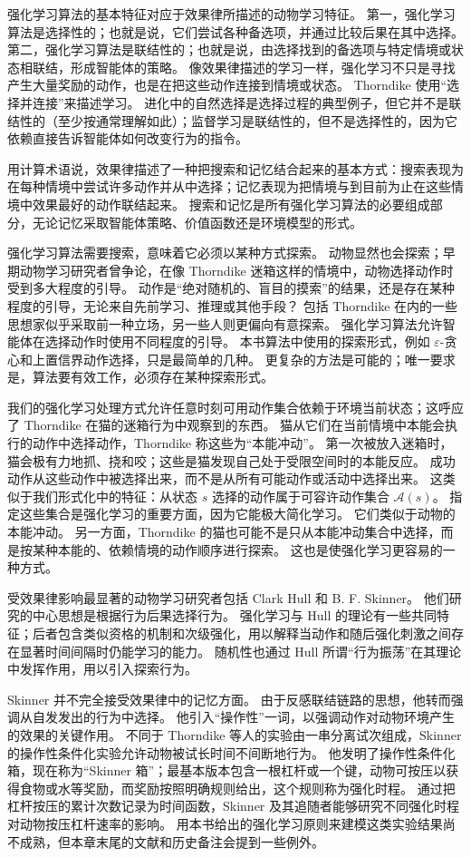 \documentclass[UTF8,12pt,a4paper,fontset=fandol]{ctexart}
\begin{document}
强化学习算法的基本特征对应于效果律所描述的动物学习特征。
第一，强化学习算法是选择性的；也就是说，它们尝试各种备选项，并通过比较后果在其中选择。
第二，强化学习算法是联结性的；也就是说，由选择找到的备选项与特定情境或状态相联结，形成智能体的策略。
像效果律描述的学习一样，强化学习不只是寻找产生大量奖励的动作，也是在把这些动作连接到情境或状态。
Thorndike 使用“选择并连接”来描述学习。
进化中的自然选择是选择过程的典型例子，但它并不是联结性的（至少按通常理解如此）；监督学习是联结性的，但不是选择性的，因为它依赖直接告诉智能体如何改变行为的指令。

用计算术语说，效果律描述了一种把搜索和记忆结合起来的基本方式：搜索表现为在每种情境中尝试许多动作并从中选择；记忆表现为把情境与到目前为止在这些情境中效果最好的动作联结起来。
搜索和记忆是所有强化学习算法的必要组成部分，无论记忆采取智能体策略、价值函数还是环境模型的形式。

强化学习算法需要搜索，意味着它必须以某种方式探索。
动物显然也会探索；早期动物学习研究者曾争论，在像 Thorndike 迷箱这样的情境中，动物选择动作时受到多大程度的引导。
动作是“绝对随机的、盲目的摸索”的结果，还是存在某种程度的引导，无论来自先前学习、推理或其他手段？
包括 Thorndike 在内的一些思想家似乎采取前一种立场，另一些人则更偏向有意探索。
强化学习算法允许智能体在选择动作时使用不同程度的引导。
本书算法中使用的探索形式，例如 $\varepsilon$-贪心和上置信界动作选择，只是最简单的几种。
更复杂的方法是可能的；唯一要求是，算法要有效工作，必须存在某种探索形式。

我们的强化学习处理方式允许任意时刻可用动作集合依赖于环境当前状态；这呼应了 Thorndike 在猫的迷箱行为中观察到的东西。
猫从它们在当前情境中本能会执行的动作中选择动作，Thorndike 称这些为“本能冲动”。
第一次被放入迷箱时，猫会极有力地抓、挠和咬；这些是猫发现自己处于受限空间时的本能反应。
成功动作从这些动作中被选择出来，而不是从所有可能动作或活动中选择出来。
这类似于我们形式化中的特征：从状态 $s$ 选择的动作属于可容许动作集合 $\mathcal{A}(s)$。
指定这些集合是强化学习的重要方面，因为它能极大简化学习。
它们类似于动物的本能冲动。
另一方面，Thorndike 的猫也可能不是只从本能冲动集合中选择，而是按某种本能的、依赖情境的动作顺序进行探索。
这也是使强化学习更容易的一种方式。

受效果律影响最显著的动物学习研究者包括 Clark Hull 和 B. F. Skinner。
他们研究的中心思想是根据行为后果选择行为。
强化学习与 Hull 的理论有一些共同特征；后者包含类似资格的机制和次级强化，用以解释当动作和随后强化刺激之间存在显著时间间隔时仍能学习的能力。
随机性也通过 Hull 所谓“行为振荡”在其理论中发挥作用，用以引入探索行为。

Skinner 并不完全接受效果律中的记忆方面。
由于反感联结链路的思想，他转而强调从自发发出的行为中选择。
他引入“操作性”一词，以强调动作对动物环境产生的效果的关键作用。
不同于 Thorndike 等人的实验由一串分离试次组成，Skinner 的操作性条件化实验允许动物被试长时间不间断地行为。
他发明了操作性条件化箱，现在称为“Skinner 箱”；最基本版本包含一根杠杆或一个键，动物可按压以获得食物或水等奖励，而奖励按照明确规则给出，这个规则称为强化时程。
通过把杠杆按压的累计次数记录为时间函数，Skinner 及其追随者能够研究不同强化时程对动物按压杠杆速率的影响。
用本书给出的强化学习原则来建模这类实验结果尚不成熟，但本章末尾的文献和历史备注会提到一些例外。
\end{document}
